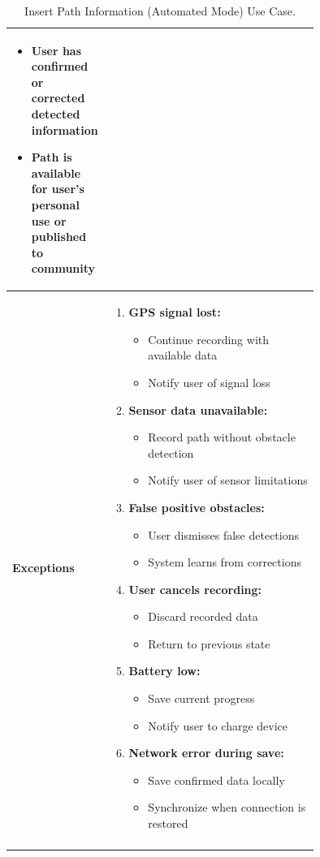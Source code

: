 \begin{center}
\begin{longtable}{|l|p{0.75\linewidth}|}
\begin{itemize}
            \item User has confirmed or corrected detected information
            \item Path is available for user's personal use or published to community
        \end{itemize} \\
        \hline
        \textbf{Exceptions}       & 
        \begin{enumerate}
            \item \textbf{GPS signal lost:}
            \begin{itemize}
                \item Continue recording with available data
                \item Notify user of signal loss
            \end{itemize}
            \item \textbf{Sensor data unavailable:}
            \begin{itemize}
                \item Record path without obstacle detection
                \item Notify user of sensor limitations
            \end{itemize}
            \item \textbf{False positive obstacles:}
            \begin{itemize}
                \item User dismisses false detections
                \item System learns from corrections
            \end{itemize}
            \item \textbf{User cancels recording:}
            \begin{itemize}
                \item Discard recorded data
                \item Return to previous state
            \end{itemize}
            \item \textbf{Battery low:}
            \begin{itemize}
                \item Save current progress
                \item Notify user to charge device
            \end{itemize}
            \item \textbf{Network error during save:}
            \begin{itemize}
                \item Save confirmed data locally
                \item Synchronize when connection is restored
            \end{itemize}
        \end{enumerate} \\
        \hline
        \caption{Insert Path Information (Automated Mode) Use Case.}
        \label{tab:insert_path_automated_use_case}
    \end{longtable}
\end{center}

